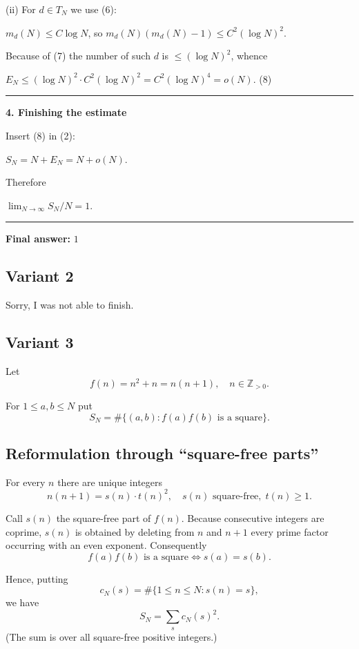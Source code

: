 \documentclass[12pt,a4paper]{article}
\theoremstyle{definition}
\begin{document}
    (ii) For $d \in T_N$ we use (6):

    $m_d(N) \leq C \log N$, so $m_d(N)(m_d(N)-1) \leq C^2(\log N)^2$.

    Because of (7) the number of such $d$ is $\leq (\log N)^2$, whence

    $E_N \leq (\log N)^2 \cdot C^2(\log N)^2 = C^2(\log N)^4 = o(N)$. \qquad (8)

    \hrule

    \textbf{4. Finishing the estimate}

    Insert (8) in (2):

    $S_N = N + E_N = N + o(N)$.

    Therefore

    $\lim_{N \to \infty} S_N/N = 1$.

    \hrule

    \textbf{Final answer:} $1$
\subsection{Variant 2}
    Sorry, I was not able to finish.

\subsection{Variant 3}
        Let
        \[f(n) = n^2 + n = n(n+1), \quad n \in \mathbb{Z}_{>0}.\]

        For $1 \leq a, b \leq N$ put
        \[S_N = \#\{(a,b) : f(a)f(b) \text{ is a square}\}.\]

        \subsection*{Reformulation through ``square-free parts''}

        For every $n$ there are unique integers
        \[n(n+1) = s(n) \cdot t(n)^2, \quad s(n) \text{ square-free}, \; t(n) \geq 1.\]

        Call $s(n)$ the square-free part of $f(n)$.
        Because consecutive integers are coprime, $s(n)$ is obtained by deleting
        from $n$ and $n+1$ every prime factor occurring with an even exponent.
        Consequently
        \[f(a)f(b) \text{ is a square} \Longleftrightarrow s(a) = s(b).\]

        Hence, putting
        \[c_N(s) = \#\{1 \leq n \leq N : s(n) = s\},\]
        we have
        \begin{equation}
            S_N = \sum_s c_N(s)^2.
        \end{equation}
        (The sum is over all square-free positive integers.)
\end{document}
